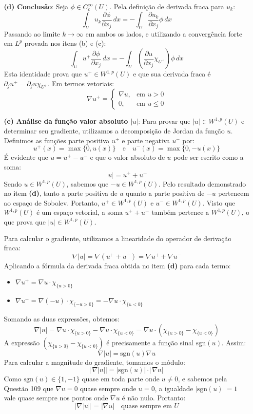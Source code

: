 \documentclass[cs_edp_2026.1.tex]{subfiles} %
\begin{document}
{	\textbf{(d) Conclusão}:
	Seja $\phi \in C_c^\infty(U)$. Pela definição de derivada fraca para $u_k$:
	$$\int_U u_k \frac{\partial \phi}{\partial x_j} \, dx = - \int_U \frac{\partial u_k}{\partial x_j} \phi \, dx$$
	Passando ao limite $k \to \infty$ em ambos os lados, e utilizando a convergência forte em $L^p$ provada nos itens (b) e (c):
	$$\int_U u^+ \frac{\partial \phi}{\partial x_j} \, dx = - \int_U \left( \frac{\partial u}{\partial x_j} \chi_{U^+} \right) \phi \, dx$$
	Esta identidade prova que $u^+ \in W^{1,p}(U)$ e que sua derivada fraca é $\partial_j u^+ = \partial_j u \chi_{U^+}$. Em termos vetoriais:
	$$\boxed{\nabla u^+ = \begin{cases} \nabla u, & \text{em } u > 0 \\ 0, & \text{em } u \le 0 \end{cases}}$$
	
	\textbf{(e) Análise da função valor absoluto $|u|$}:
	Para provar que $|u| \in W^{1,p}(U)$ e determinar seu gradiente, utilizamos a decomposição de Jordan da função $u$. Definimos as funções parte positiva $u^+$ e parte negativa $u^-$ por:
	$$u^+(x) = \max\{0, u(x)\} \quad \text{e} \quad u^-(x) = \max\{0, -u(x)\}$$
	É evidente que $u = u^+ - u^-$ e que o valor absoluto de $u$ pode ser escrito como a soma:
	$$|u| = u^+ + u^-$$
	Sendo $u \in W^{1,p}(U)$, sabemos que $-u \in W^{1,p}(U)$. Pelo resultado demonstrado no item \textbf{(d)}, tanto a parte positiva de $u$ quanto a parte positiva de $-u$ pertencem ao espaço de Sobolev. Portanto, $u^+ \in W^{1,p}(U)$ e $u^- \in W^{1,p}(U)$. Visto que $W^{1,p}(U)$ é um espaço vetorial, a soma $u^+ + u^-$ também pertence a $W^{1,p}(U)$, o que prova que $|u| \in W^{1,p}(U)$.
	
	Para calcular o gradiente, utilizamos a linearidade do operador de derivação fraca:
	$$\nabla |u| = \nabla (u^+ + u^-) = \nabla u^+ + \nabla u^-$$
	Aplicando a fórmula da derivada fraca obtida no item \textbf{(d)} para cada termo:
	\begin{itemize}
		\item $\nabla u^+ = \nabla u \cdot \chi_{\{u > 0\}}$
		\item $\nabla u^- = \nabla (-u) \cdot \chi_{\{-u > 0\}} = -\nabla u \cdot \chi_{\{u < 0\}}$
	\end{itemize}
	Somando as duas expressões, obtemos:
	$$\nabla |u| = \nabla u \cdot \chi_{\{u > 0\}} - \nabla u \cdot \chi_{\{u < 0\}} = \nabla u \cdot (\chi_{\{u > 0\}} - \chi_{\{u < 0\}})$$
	A expressão $(\chi_{\{u > 0\}} - \chi_{\{u < 0\}})$ é precisamente a função sinal $\text{sgn}(u)$. Assim:
	$$\nabla |u| = \text{sgn}(u) \nabla u$$
	Para calcular a magnitude do gradiente, tomamos o módulo:
	$$|\nabla |u|| = |\text{sgn}(u)| \cdot |\nabla u|$$
	Como $\text{sgn}(u) \in \{1, -1\}$ quase em toda parte onde $u \neq 0$, e sabemos pela Questão 109 que $\nabla u = 0$ quase sempre onde $u = 0$, a igualdade $|\text{sgn}(u)| = 1$ vale quase sempre nos pontos onde $\nabla u$ é não nulo. Portanto:
	$$\boxed{|\nabla |u|| = |\nabla u| \quad \text{quase sempre em } U}$$
}
\end{document}
